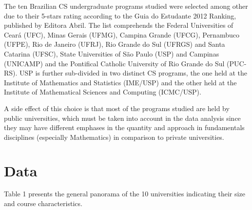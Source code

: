 \documentclass[conference]{IEEEtran}
\begin{document}
	The ten Brazilian CS undergraduate programs studied were selected among other due to their 5-stars rating according to the Guia do Estudante 2012 Ranking, published by Editora Abril. \cite{guia_estudante} The list comprehends the Federal Universities of Ceará (UFC), Minas Gerais (UFMG), Campina Grande (UFCG), Pernambuco (UFPE), Rio de Janeiro (UFRJ), Rio Grande do Sul (UFRGS) and Santa Catarina (UFSC), State Universities of São Paulo (USP) and Campinas (UNICAMP) and the Pontifical Catholic University of Rio Grande do Sul (PUC-RS). USP is further sub-divided in two distinct CS programs, the one held at the Institute of Mathematics and Statistics (IME/USP) and the other held at the Institute of Mathematical Sciences and Computing (ICMC/USP).
	
	A side effect of this choice is that most of the programs studied are held by public universities, which must be taken into account in the data analysis since they may have different emphases in the quantity and approach in fundamentals disciplines (especially Mathematics) in comparison to private universities.
	
\section{Data}
Table 1 presents the general panorama of the 10 universities indicating their size and course characteristics.
\end{document}
